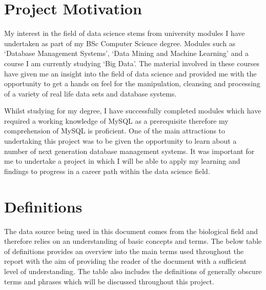 \section{Project Motivation}
My interest in the field of data science stems from university modules I have undertaken as part of my BSc Computer Science degree. Modules such as `Database Management Systems', `Data Mining and Machine Learning' and a course I am currently studying `Big Data'. The material involved in these courses have given me an insight into the field of data science and provided me with the opportunity to get a hands on feel for the manipulation, cleansing and processing of a variety of real life data sets and database systems.

Whilst studying for my degree, I have successfully completed modules which have required a working knowledge of MySQL as a prerequisite therefore my comprehension of MySQL is proficient. One of the main attractions to undertaking this project was to be given the opportunity to learn about a number of next generation database management systems. It was important for me to undertake a project in which I will be able to apply my learning and findings to progress in a career path within the data science field.

\section{Definitions}
The data source being used in this document comes from the biological field and therefore relies on an understanding of basic concepts and terms. The below table of definitions provides an overview into the main terms used throughout the report with the aim of providing the reader of the document with a sufficient level of understanding. The table also includes the definitions of generally obscure terms and phrases which will be discussed throughout this project.

